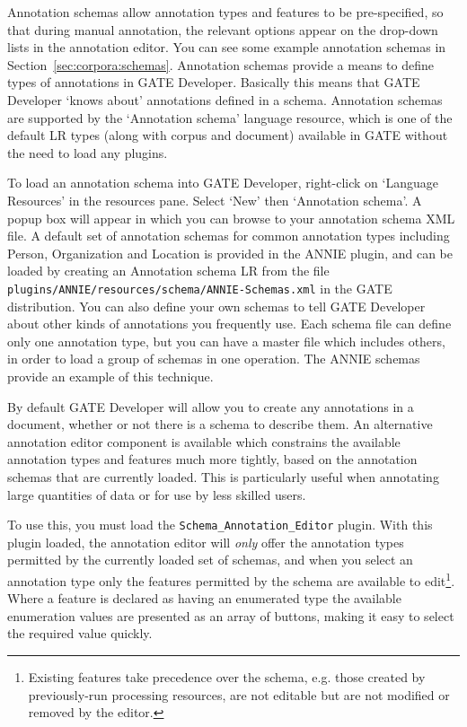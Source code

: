 
Annotation schemas allow annotation types and features to be pre-specified, so
that during manual annotation, the relevant options appear on the drop-down lists
in the annotation editor. You can see some example annotation schemas in
Section~\ref{sec:corpora:schemas}. Annotation schemas provide a means to define
types of annotations in GATE Developer. Basically this means that GATE Developer
`knows about' annotations defined in a schema.
Annotation schemas are supported by the `Annotation schema' language resource,
which is one of the default LR types (along with corpus and document) available
in GATE without the need to load any plugins.

To load an annotation schema into GATE Developer, right-click on `Language
Resources' in the resources pane. Select `New' then `Annotation schema'. A
popup box will appear in which you can browse to your annotation schema XML
file.  A default set of annotation schemas for common annotation types
including Person, Organization and Location is provided in the ANNIE plugin,
and can be loaded by creating an Annotation schema LR from the file {\tt
plugins/ANNIE/resources/schema/ANNIE-Schemas.xml} in the GATE distribution.
You can also define your own schemas to tell GATE Developer about other kinds
of annotations you frequently use.  Each schema file can define only one
annotation type, but you can have a master file which includes others, in order
to load a group of schemas in one operation.  The ANNIE schemas provide an
example of this technique.

By default GATE Developer will allow you to create any annotations in a
document, whether or not there is a schema to describe them.  An alternative
annotation editor component is available which constrains the available
annotation types and features much more tightly, based on the annotation
schemas that are currently loaded.  This is particularly useful when annotating
large quantities of data or for use by less skilled users.

To use this, you must load the \verb|Schema_Annotation_Editor| plugin. With
this plugin loaded, the annotation editor will \emph{only} offer the annotation
types permitted by the currently loaded set of schemas, and when you select an
annotation type only the features permitted by the schema are available to
edit\footnote{Existing features take precedence over the schema, e.g. those created by
previously-run processing resources, are not editable but are not modified or
removed by the editor.}.  Where a feature is declared as having an enumerated
type the available enumeration values are presented as an array of buttons,
making it easy to select the required value quickly.

